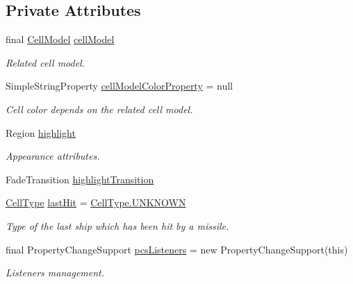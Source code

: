 \subsection*{Private Attributes}
\begin{DoxyCompactItemize}
\item 
final \hyperlink{classbattleship2D_1_1model_1_1CellModel}{Cell\-Model} \hyperlink{classbattleship2D_1_1ui_1_1CellUI_ae8ba5dba09afebc304ec693a37950cfb}{cell\-Model}
\begin{DoxyCompactList}\small\item\em Related cell model. \end{DoxyCompactList}\item 
Simple\-String\-Property \hyperlink{classbattleship2D_1_1ui_1_1CellUI_a503b29c1a9fb26fb983caebf772c8c90}{cell\-Model\-Color\-Property} = null
\begin{DoxyCompactList}\small\item\em Cell color depends on the related cell model. \end{DoxyCompactList}\item 
Region \hyperlink{classbattleship2D_1_1ui_1_1CellUI_a8740932a3854223098d31cf94b09f82c}{highlight}
\begin{DoxyCompactList}\small\item\em Appearance attributes. \end{DoxyCompactList}\item 
Fade\-Transition \hyperlink{classbattleship2D_1_1ui_1_1CellUI_a5abb394f8190a79f8cb0d6b352af6333}{highlight\-Transition}
\item 
\hyperlink{enumbattleship2D_1_1model_1_1CellType}{Cell\-Type} \hyperlink{classbattleship2D_1_1ui_1_1CellUI_a90990b04506f285810963675dfa2c668}{last\-Hit} = \hyperlink{enumbattleship2D_1_1model_1_1CellType_a8d4deb923c1df4cd4148f298e4adfdfb}{Cell\-Type.\-U\-N\-K\-N\-O\-W\-N}
\begin{DoxyCompactList}\small\item\em Type of the last ship which has been hit by a missile. \end{DoxyCompactList}\item 
final Property\-Change\-Support \hyperlink{classbattleship2D_1_1ui_1_1CellUI_af26c7ea10eff42c4a67c9395454e4e9a}{pcs\-Listeners} = new Property\-Change\-Support(this)
\begin{DoxyCompactList}\small\item\em Listeners management. \end{DoxyCompactList}\end{DoxyCompactItemize}
